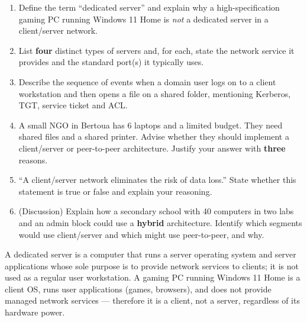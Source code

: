 \documentclass[11pt]{article}
\begin{document}
\begin{exercice}
\begin{enumerate}
\item Define the term ``dedicated server'' and explain why a high-specification gaming PC running Windows 11 Home is \emph{not} a dedicated server in a client/server network.
\item List \textbf{four} distinct types of servers and, for each, state the network service it provides and the standard port(s) it typically uses.
\item Describe the sequence of events when a domain user logs on to a client workstation and then opens a file on a shared folder, mentioning Kerberos, TGT, service ticket and ACL.
\item A small NGO in Bertoua has 6 laptops and a limited budget. They need shared files and a shared printer. Advise whether they should implement a client/server or peer-to-peer architecture. Justify your answer with \textbf{three} reasons.
\item ``A client/server network eliminates the risk of data loss.'' State whether this statement is true or false and explain your reasoning.
\item (Discussion) Explain how a secondary school with 40 computers in two labs and an admin block could use a \textbf{hybrid} architecture. Identify which segments would use client/server and which might use peer-to-peer, and why.
\end{enumerate}
\end{exercice}

\begin{corrige}[Exercise 1]
A dedicated server is a computer that runs a server operating system and server applications whose sole purpose is to provide network services to clients; it is not used as a regular user workstation. A gaming PC running Windows 11 Home is a client OS, runs user applications (games, browsers), and does not provide managed network services — therefore it is a client, not a server, regardless of its hardware power.
\end{corrige}
\end{document}
